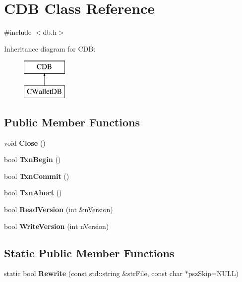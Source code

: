 \hypertarget{class_c_d_b}{}\section{C\+DB Class Reference}
\label{class_c_d_b}


{\ttfamily \#include $<$db.\+h$>$}

Inheritance diagram for C\+DB\+:\begin{figure}[H]
\begin{center}
\leavevmode
\includegraphics[height=2.000000cm]{class_c_d_b}
\end{center}
\end{figure}
\subsection*{Public Member Functions}
\begin{DoxyCompactItemize}
\item 
\mbox{\label{class_c_d_b_af8bbf106662d67cdfdd6d58c429bc54b}} 
void {\bfseries Close} ()
\item 
\mbox{\label{class_c_d_b_a6f817da7947e1498e44034b7a1c8ac10}} 
bool {\bfseries Txn\+Begin} ()
\item 
\mbox{\label{class_c_d_b_a45061b3e71251dc74ddd868afb760590}} 
bool {\bfseries Txn\+Commit} ()
\item 
\mbox{\label{class_c_d_b_af9b0924f1ca98e0544e78e9bb58b4f03}} 
bool {\bfseries Txn\+Abort} ()
\item 
\mbox{\label{class_c_d_b_a16f591e27f41397570018c1fae084025}} 
bool {\bfseries Read\+Version} (int \&n\+Version)
\item 
\mbox{\label{class_c_d_b_aa3e63c0921af4c6fc92def1ba14500f1}} 
bool {\bfseries Write\+Version} (int n\+Version)
\end{DoxyCompactItemize}
\subsection*{Static Public Member Functions}
\begin{DoxyCompactItemize}
\item 
\mbox{\label{class_c_d_b_acfb8a373edb9c4cfab780fb7578b277e}} 
static bool {\bfseries Rewrite} (const std\+::string \&str\+File, const char $\ast$psz\+Skip=N\+U\+LL)
\end{DoxyCompactItemize}
